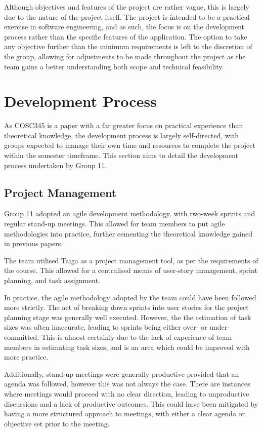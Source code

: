 \documentclass[conference]{IEEEtran}
\begin{document}
Although objectives and features of the project are rather vague, this is largely due to the nature of the project itself. The project is intended to be a practical exercise in software engineering, and as such, the focus is on the development process rather than the specific features of the application. The option to take any objective further than the minimum requirements is left to the discretion of the group, allowing for adjustments to be made throughout the project as the team gains a better understanding both scope and technical feasibility.

\section{Development Process}
As COSC345 is a paper with a far greater focus on practical experience than theoretical knowledge, the development process is largely self-directed, with groups expected to manage their own time and resources to complete the project within the semester timeframe. This section aims to detail the development process undertaken by Group 11.

\subsection{Project Management}
Group 11 adopted an agile development methodology, with two-week sprints and regular stand-up meetings. This allowed for team members to put agile methodologies into practice, further cementing the theoretical knowledge gained in previous papers.

The team utilised Taiga as a project management tool, as per the requirements of the course. This allowed for a centralised means of user-story management, sprint planning, and task assignment.

In practice, the agile methodology adopted by the team could have been followed more strictly. The act of breaking down sprints into user stories for the project planning stage was generally well executed. However, the the estimation of task sizes was often inaccurate, leading to sprints being either over- or under-committed. This is almost certainly due to the lack of experience of team members in estimating task sizes, and is an area which could be improved with more practice.

Additionally, stand-up meetings were generally productive provided that an agenda was followed, however this was not always the case. There are instances where meetings would proceed with no clear direction, leading to unproductive discussions and a lack of productive outcomes. This could have been mitigated by having a more structured approach to meetings, with either a clear agenda or objective set prior to the meeting.
\end{document}
